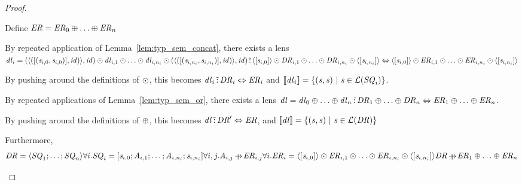 \documentclass[numbers,10pt,preprint\ifanon ,nocopyrightspace\fi]{sigplanconf}
\begin{document}
\begin{proof}
\begin{case}[\ParallelSwapDNFStructuralRewriteRule{}]
    Define $\mathit{ER} = \mathit{ER}_0 \oplus \ldots \oplus \mathit{ER}_n$
    
    By repeated application of Lemma~\ref{lem:typ_sem_concat}, there exists a
    lens
    $\mathit{dl}_i =
    (\langle([(\mathit{s}_{i,0},\mathit{s}_{i,0})],\mathit{id})\rangle,\mathit{id})
    \odot \mathit{dl}_{i,1}
    \odot \ldots \odot
    \mathit{dl}_{i,n_i} \odot
    (\langle([(\mathit{s}_{i,n_i},\mathit{s}_{i,n_i})],\mathit{id})\rangle,\mathit{id})
    \,\tilde{:}\,
    \langle[\mathit{s}_{i,0}]\rangle \odot
    \mathit{DR}_{i,1} \odot \ldots \odot \mathit{DR}_{i,n_i}
    \odot \langle[\mathit{s}_{i,n_i}]\rangle \Leftrightarrow
    \langle[\mathit{s}_{i,0}]\rangle \odot
    \mathit{ER}_{i,1} \odot \ldots \odot \mathit{ER}_{i,n_i}
    \odot \langle[\mathit{s}_{i,n_i}]\rangle$
    
    By pushing around the definitions of $\odot$, this becomes
    $\mathit{dl}_i \,\tilde{:}\,
    \mathit{DR}_i
    \Leftrightarrow
    \mathit{ER}_i$ and
    $[ \! [\mathit{dl}_i] \! ] = \{(\mathit{s},\mathit{s}) ~|~
      \mathit{s} \in \mathcal{L}(\mathit{SQ}_i)\}$.

    By repeated applications of Lemma~\ref{lem:typ_sem_or}, there exists a lens
    $\mathit{dl} =
    \mathit{dl}_0 \oplus \ldots \oplus \mathit{dl}_n 
    \,\tilde{:}\,
    \mathit{DR}_1 \oplus \ldots \oplus \mathit{DR}_n
    \Leftrightarrow
    \mathit{ER}_1 \oplus \ldots \oplus \mathit{ER}_n$.
    
    By pushing around the definitions of $\oplus$, this becomes
    $\mathit{dl} \,\tilde{:}\,
    \mathit{DR}' \Leftrightarrow \mathit{ER}$, and
    $[ \! [\mathit{dl}] \! ] =
    \{(\mathit{s},\mathit{s}) ~|~ \mathit{s}\in\mathcal{L}(\mathit{DR})\}$

    Furthermore,
    \[
      {
        \DNFRegex = \DNFOf{\Sequence_1;\ldots;\Sequence_n}\\
        \forall i. \Sequence_i =
        \SequenceOf{\String_{i,0};\Atom_{i,1};\ldots;\Atom_{i,n_i};\String_{i,n_i}}\\
        \forall i,j. \Atom_{i,j} \ParallelRewrite \DNFRegexAlt_{i,j}\\
        \forall i. \DNFRegexAlt_i = \DNFOf{\SequenceOf{\String_{i,0}}}
        \ConcatDNF \DNFRegexAlt_{i,1}
        \ConcatDNF \ldots \ConcatDNF \DNFRegexAlt_{i,n_i} \ConcatDNF
        \DNFOf{\SequenceOf{\String_{i,n_i}}}
      }
      {
        \DNFRegex \ParallelRewrite \DNFRegexAlt_1 \OrDNF \ldots \OrDNF \DNFRegexAlt_n
      }
    \]
  \end{case}
  

\end{proof}
\end{document}
